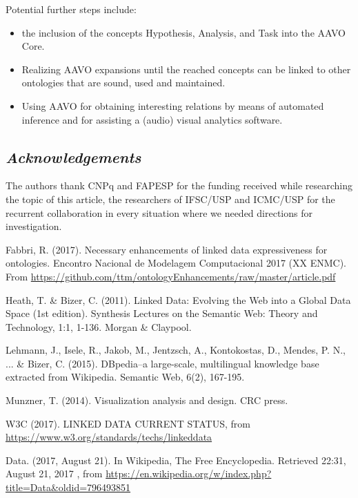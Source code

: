 \documentclass[12pt,fleqn]{article}
\begin{document}
Potential further steps include:
\begin{itemize}
	\item the inclusion of the concepts Hypothesis, Analysis, and Task
		into the AAVO Core.
	\item Realizing AAVO expansions until the reached concepts can be linked
		to other ontologies that are sound, used and maintained.
	\item Using AAVO for obtaining interesting relations by means of automated
		inference and for assisting a (audio) visual analytics software.
\end{itemize}



\subsection*{\textit{Acknowledgements}}
The authors thank CNPq and FAPESP for the funding received while researching the topic of this article,
the researchers of IFSC/USP and ICMC/USP for the recurrent collaboration in every situation
where we needed directions for investigation.

\begin{thebibliography}{99}
\fontsize{11}{0}\selectfont
{}
	Fabbri, R. (2017). Necessary enhancements of linked data expressiveness for ontologies.
		Encontro Nacional de Modelagem Computacional 2017 (XX ENMC).
		From \url{https://github.com/ttm/ontologyEnhancements/raw/master/article.pdf}

	Heath, T. \& Bizer, C. (2011). Linked Data: Evolving the Web into a Global Data Space (1st edition). Synthesis Lectures on the Semantic Web: Theory and Technology, 1:1, 1-136. Morgan \& Claypool.

	Lehmann, J., Isele, R., Jakob, M., Jentzsch, A., Kontokostas, D., Mendes, P. N., ... \& Bizer, C. (2015). DBpedia–a large-scale, multilingual knowledge base extracted from Wikipedia. Semantic Web, 6(2), 167-195.

	Munzner, T. (2014). Visualization analysis and design. CRC press.

	W3C (2017). LINKED DATA CURRENT STATUS, from \url{https://www.w3.org/standards/techs/linkeddata}

	Data. (2017, August 21). In Wikipedia, The Free Encyclopedia. Retrieved
		22:31, August 21, 2017
		, from \url{https://en.wikipedia.org/w/index.php?title=Data&oldid=796493851}

\end{thebibliography}





\end{document}
